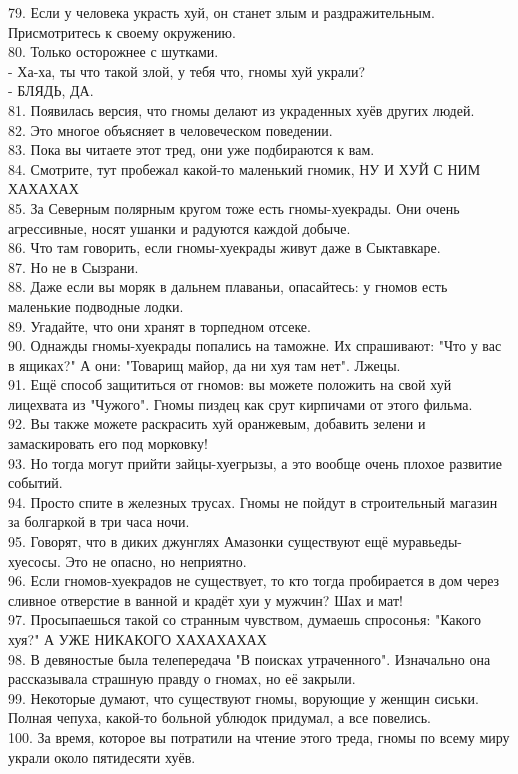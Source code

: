 \documentclass[a4paper,20pt,notitlepage]{extbook}
\begin{document}
	79. Если у человека украсть хуй, он станет злым и раздражительным. Присмотритесь к своему окружению.\\
	80. Только осторожнее с шутками.\\
	- Ха-ха, ты что такой злой, у тебя что, гномы хуй украли?\\
	- БЛЯДЬ, ДА.\\
	81. Появилась версия, что гномы делают из украденных хуёв других людей.\\
	82. Это многое объясняет в человеческом поведении.\\
	83. Пока вы читаете этот тред, они уже подбираются к вам.\\
	84. Смотрите, тут пробежал какой-то маленький гномик, НУ И ХУЙ С НИМ ХАХАХАХ\\
	85. За Северным полярным кругом тоже есть гномы-хуекрады. Они очень агрессивные, носят ушанки и радуются каждой добыче.\\
	86. Что там говорить, если гномы-хуекрады живут даже в Сыктавкаре.\\
	87. Но не в Сызрани.\\
	88. Даже если вы моряк в дальнем плаваньи, опасайтесь: у гномов есть маленькие подводные лодки.\\
	89. Угадайте, что они хранят в торпедном отсеке.\\
	90. Однажды гномы-хуекрады попались на таможне. Их спрашивают: "Что у вас в ящиках?" А они: "Товарищ майор, да ни хуя там нет". Лжецы.\\
	91. Ещё способ защититься от гномов: вы можете положить на свой хуй лицехвата из
	"Чужого". Гномы пиздец как срут кирпичами от этого фильма.\\
	92. Вы также можете раскрасить хуй оранжевым, добавить зелени и замаскировать его под морковку!\\
	93. Но тогда могут прийти зайцы-хуегрызы, а это вообще очень плохое развитие событий.\\
	94. Просто спите в железных трусах. Гномы не пойдут в строительный магазин за болгаркой в три часа ночи.\\
	95. Говорят, что в диких джунглях Амазонки существуют ещё муравьеды-хуесосы. Это не опасно, но неприятно.\\
	96. Если гномов-хуекрадов не существует, то кто тогда пробирается в дом через сливное отверстие в ванной и крадёт хуи у мужчин? Шах и мат!\\
	97. Просыпаешься такой со странным чувством, думаешь спросонья: "Какого хуя?" А УЖЕ НИКАКОГО ХАХАХАХАХ\\
	98. В девяностые была телепередача "В поисках утраченного". Изначально она рассказывала страшную правду о гномах, но её закрыли.\\
	99. Некоторые думают, что существуют гномы, ворующие у женщин сиськи. Полная чепуха, какой-то больной ублюдок придумал, а все повелись.\\
	100. За время, которое вы потратили на чтение этого треда, гномы по всему миру украли около пятидесяти хуёв.\\
	
\end{document}
